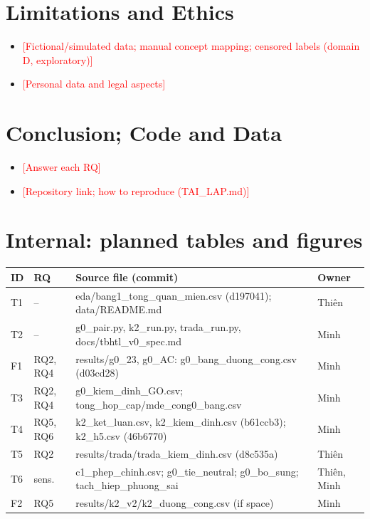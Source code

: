 \documentclass[conference]{IEEEtran}
\newcommand{\todoSV}[1]{\textcolor{red}{[#1]}}
\begin{document}
\section{Limitations and Ethics}  %
\begin{itemize}
  \item \todoSV{Fictional/simulated data; manual concept mapping; censored labels (domain D, exploratory)}
  \item \todoSV{Personal data and legal aspects}
\end{itemize}

\section{Conclusion; Code and Data}  %
\begin{itemize}
  \item \todoSV{Answer each RQ}
  \item \todoSV{Repository link; how to reproduce (TAI\_LAP.md)}
\end{itemize}

\section*{Internal: planned tables and figures}
\begin{table}[!t]\centering\scriptsize
\begin{tabular}{@{}llll@{}}
\toprule
ID & RQ & Source file (commit) & Owner \\
\midrule
T1 & -- & eda/bang1\_tong\_quan\_mien.csv (d197041); data/README.md & Thiên \\
T2 & -- & g0\_pair.py, k2\_run.py, trada\_run.py, docs/tbhtl\_v0\_spec.md & Minh \\
F1 & RQ2, RQ4 & results/g0\_23, g0\_AC: g0\_bang\_duong\_cong.csv (d03cd28) & Minh \\
T3 & RQ2, RQ4 & g0\_kiem\_dinh\_GO.csv; tong\_hop\_cap/mde\_cong0\_bang.csv & Minh \\
T4 & RQ5, RQ6 & k2\_ket\_luan.csv, k2\_kiem\_dinh.csv (b61ccb3); k2\_h5.csv (46b6770) & Minh \\
T5 & RQ2 & results/trada/trada\_kiem\_dinh.csv (d8c535a) & Thiên \\
T6 & sens. & c1\_phep\_chinh.csv; g0\_tie\_neutral; g0\_bo\_sung; tach\_hiep\_phuong\_sai & Thiên, Minh \\
F2 & RQ5 & results/k2\_v2/k2\_duong\_cong.csv (if space) & Minh \\
\bottomrule
\end{tabular}
\end{table}
\end{document}

